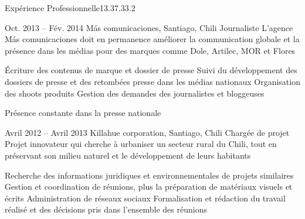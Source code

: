 \documentclass[30pt, french]{tccv}
\begin{document}
\begin{upshape}
\begin{flat_frame}{Expérience Professionnelle}{13.3}{7.3}{3.2}{}
\begin{eventlist}
\setlength{\parskip}{0pt}    
\item{Oct. 2013 -- Fév. 2014 }     
  {Más comunicaciones, Santiago, Chili}     
  {Journaliste}
     \fontsize{9pt}{1em}\color{text}\bodyfontlight\upshape\selectfont
%    
 L’agence Más comunicaciones doit en permanence améliorer la communication globale et la présence dans les médias
pour des marques comme Dole, Artilec, MOR et Flores\\

\setlength{\parskip}{-10pt}
\begin{itemize}
      \setlength\itemsep{-3pt} 
      \cvitem[\checkmark]  Écriture des contenus de marque et dossier de presse                                        
      \cvitem[\checkmark]  Suivi du développement des dossiers de presse et des retombées presse dans les médias nationaux                                             
      \cvitem[\checkmark]  Organisation des shoots produits 
      \cvitem[\checkmark]  Gestion des demandes des journalistes et bloggeuses 

\end{itemize}       
 Présence constante dans la presse nationale
\vspace{0.5cm}




\setlength{\parskip}{0pt}
\item{Avril 2012 -- Avril 2013 }     
  {Killahue corporation, Santiago, Chili}     
  {Chargée de projet}
\fontsize{9pt}{1em}\color{text}\bodyfontlight\upshape\selectfont
%
 Projet innovateur qui cherche à urbaniser un secteur rural du Chili, tout en préservant son milieu naturel et le développement de leurs habitants \\
     
\setlength{\parskip}{-10pt}
\begin{itemize}
      \setlength\itemsep{-3pt} 
      \cvitem[\checkmark] Recherche des informations juridiques et environnementales de projets similaires          
      \cvitem[\checkmark] Gestion et coordination de réunions, plus la préparation de matériaux visuels et écrits   
      \cvitem[\checkmark] Administration de réseaux sociaux                                                                    
      \cvitem[\checkmark] Formalisation et rédaction du travail réalisé et des décisions pris dans l’ensemble des réunions     
\end{itemize}      


\end{eventlist}
\end{flat_frame}
\end{upshape}
\end{document}

